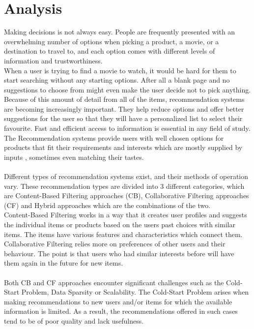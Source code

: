 \documentclass[10pt,oneside,english,a4paper]{article}
\begin{document}
\section{Analysis}
Making decisions is not always easy. People are frequently presented with an overwhelming number of options when picking a product, a movie, or a destination to travel to, and each option comes with different levels of information and trustworthiness. \\
When a user is trying to find a movie to watch, it would be hard for them to start searching without any starting options. After all a blank page and no suggestions to choose from might even make the user decide not to pick anything. \\ 
Because of this amount of detail from all of the items, recommendation systems are becoming increasingly important. They help reduce options and offer better suggestions for the user so that they will have a personalized list to select their favourite. Fast and efficient access to information is essential in any field of study. 
The Recommendation systems provide users with well chosen options for products that fit their requirements and interests which are mostly supplied by inputs \cite{Philip2014}, sometimes even matching their tastes.\\\\
Different types of recommendation systems exist, and their methods of operation vary. These recommendation types are divided into 3 different categories, which are Content-Based Filtering approaches (CB), Collaborative Filtering approaches (CF) and Hybrid approaches which are the combinations of the two.\\
Content-Based Filtering works in a way that it creates user profiles and suggests the individual items or products based on the users past choices with similar items. The items have various features and characteristics which connect them.
Collaborative Filtering relies more on preferences of other users and their behaviour. The point is that users who had similar interests before will have them again in the future for new items.\\\\
Both CB and CF approaches encounter significant challenges such as the Cold-Start Problem, Data Sparsity or Scalability. The Cold-Start Problem arises when making recommendations to new users and/or items for which the available information is limited. As a result, the recommendations offered in such cases tend to be of poor quality and lack usefulness.\cite{Al-Hassan2024a}\\\\
%
\end{document}
